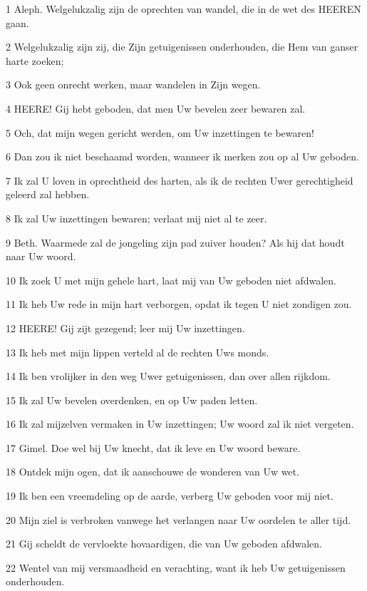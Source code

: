 \par 1 Aleph. Welgelukzalig zijn de oprechten van wandel, die in de wet des HEEREN gaan.
\par 2 Welgelukzalig zijn zij, die Zijn getuigenissen onderhouden, die Hem van ganser harte zoeken;
\par 3 Ook geen onrecht werken, maar wandelen in Zijn wegen.
\par 4 HEERE! Gij hebt geboden, dat men Uw bevelen zeer bewaren zal.
\par 5 Och, dat mijn wegen gericht werden, om Uw inzettingen te bewaren!
\par 6 Dan zou ik niet beschaamd worden, wanneer ik merken zou op al Uw geboden.
\par 7 Ik zal U loven in oprechtheid des harten, als ik de rechten Uwer gerechtigheid geleerd zal hebben.
\par 8 Ik zal Uw inzettingen bewaren; verlaat mij niet al te zeer.
\par 9 Beth. Waarmede zal de jongeling zijn pad zuiver houden? Als hij dat houdt naar Uw woord.
\par 10 Ik zoek U met mijn gehele hart, laat mij van Uw geboden niet afdwalen.
\par 11 Ik heb Uw rede in mijn hart verborgen, opdat ik tegen U niet zondigen zou.
\par 12 HEERE! Gij zijt gezegend; leer mij Uw inzettingen.
\par 13 Ik heb met mijn lippen verteld al de rechten Uws monds.
\par 14 Ik ben vrolijker in den weg Uwer getuigenissen, dan over allen rijkdom.
\par 15 Ik zal Uw bevelen overdenken, en op Uw paden letten.
\par 16 Ik zal mijzelven vermaken in Uw inzettingen; Uw woord zal ik niet vergeten.
\par 17 Gimel. Doe wel bij Uw knecht, dat ik leve en Uw woord beware.
\par 18 Ontdek mijn ogen, dat ik aanschouwe de wonderen van Uw wet.
\par 19 Ik ben een vreemdeling op de aarde, verberg Uw geboden voor mij niet.
\par 20 Mijn ziel is verbroken vanwege het verlangen naar Uw oordelen te aller tijd.
\par 21 Gij scheldt de vervloekte hovaardigen, die van Uw geboden afdwalen.
\par 22 Wentel van mij versmaadheid en verachting, want ik heb Uw getuigenissen onderhouden.

